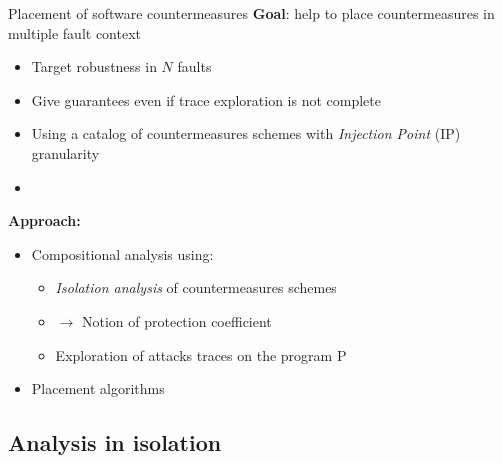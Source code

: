 \begin{frame}[fragile]{Placement of software countermeasures} 
    \textbf{Goal}: help to place countermeasures in multiple fault context 
    
    \begin{itemize}
        \item Target robustness in $N$ faults
        \item Give guarantees even if trace exploration is not complete
        \item Using a catalog of countermeasures schemes with \textit{Injection Point} (IP) granularity 
        \item []
    \end{itemize}

    \textbf{Approach:}
    \begin{itemize}
        \item  Compositional analysis using:
        \begin{itemize}
            \item  \textit{Isolation analysis} of countermeasures schemes
            \item[] $\rightarrow$ Notion of protection coefficient
            \item Exploration of attacks traces on the program P
        \end{itemize}        
        \item Placement algorithms
    \end{itemize}
\vfill
\end{frame}

\subsection{Analysis in isolation}

